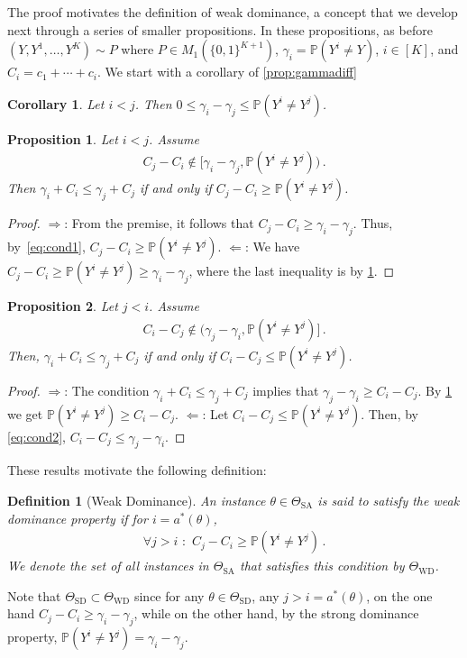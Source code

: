 \documentclass[11pt]{article} %
\newcommand{\SA}{\mathrm{SA}}
\newcommand{\SD}{\mathrm{SD}}
\newcommand{\WD}{\mathrm{WD}}
\newcommand{\TSA}{\Theta_{\SA}}
\newcommand{\TSD}{\Theta_{\SD}}
\newcommand{\TWD}{\Theta_{\WD}}
\newcommand{\Prob}[1]{\mathbb{P}\left(#1\right)}
\newtheorem{prop}{Proposition}
\newtheorem{cor}{Corollary}
\newtheorem{defi}{Definition}
\begin{document}
The proof motivates the definition of weak dominance, a concept that we develop next through a series of smaller
propositions. In these propositions, as before $(Y,Y^1,\dots,Y^K) \sim P$ where $P\in M_1(\{0,1\}^{K+1})$,
 $\gamma_i = \Prob{Y^i \ne Y}$, $i\in [K]$, and $C_i = c_1 + \cdots + c_i$.
We start with a corollary of \cref{prop:gammadiff}
\begin{cor}
\label{cor:gammadiff}
Let $i<j$. Then $0\le \gamma_i -\gamma_j \le \Prob{Y^i\ne Y^j}$.
\end{cor}
\begin{prop}
\label{prop:ilej}
Let $i<j$. Assume 
\begin{align}
\label{eq:cond1}
C_j - C_i \not\in [\gamma_i - \gamma_j, \Prob{Y^i\ne Y^j} )\,.
\end{align}
Then $\gamma_i + C_i \le \gamma_j + C_j$ if and only if $C_j - C_i \ge \Prob{Y^i\ne Y^j}$.
\end{prop}
\begin{proof}
\noindent $\Rightarrow$: From the premise, it follows that $C_j - C_i \ge \gamma_i - \gamma_j$.
Thus, by~\eqref{eq:cond1}, $C_j - C_i \ge \Prob{Y^i\ne Y^j}$.
\noindent $\Leftarrow$: We have $C_j - C_i \ge \Prob{Y^i \ne Y^j} \ge \gamma_i -\gamma_j$, where the last
inequality is by \cref{cor:gammadiff}.
\end{proof}
\begin{prop}
\label{prop:jlei}
Let $j<i$. Assume
\begin{align}
\label{eq:cond2}
C_i - C_j \not\in (\gamma_j - \gamma_i, \Prob{Y^i \ne Y^j} ]\,.
\end{align}
Then, $\gamma_i + C_i \le \gamma_j + C_j$ if and only if $C_i - C_j \le \Prob{Y^i \ne Y^j}$.
\end{prop}
\begin{proof}
\noindent $\Rightarrow$: The condition $\gamma_i + C_i \le \gamma_j + C_j$ implies that $\gamma_j -\gamma_i \ge C_i - C_j$.
By \cref{cor:gammadiff} we get $\Prob{Y^i \ne Y^j} \ge C_i - C_j$.
\noindent $\Leftarrow$: Let $C_i - C_j \le \Prob{Y^i \ne Y^j}$. Then, by \eqref{eq:cond2}, $C_i - C_j \le \gamma_j - \gamma_i$.
\end{proof}
These results motivate the following definition:
\begin{defi}[Weak Dominance]
	An instance $\theta \in \TSA$  is said to satisfy the \emph{weak dominance property} if 
	for $i = a^*(\theta)$,
	\begin{align}
	\label{eq:wd} \forall j>i\,\,: \,\, C_j - C_i \ge \Prob{Y^i\ne Y^j}\,.
	\end{align}
We denote the set of all instances in $\TSA$ that satisfies this condition by $\TWD$.	
\end{defi}
Note that $\TSD\subset \TWD$ since for any $\theta\in \TSD$, any $j>i = a^*(\theta)$, on the one hand $C_j - C_i \ge \gamma_i - \gamma_j$, while on the other hand, by the strong dominance property, $\Prob{Y^i\ne Y^j} = \gamma_i - \gamma_j$.
\end{document}
